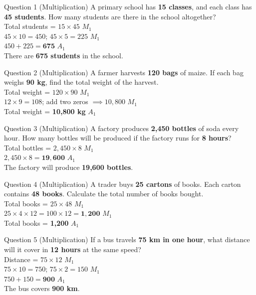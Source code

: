 \documentclass[12pt, a4paper, oneside]{article}
\begin{document}
\begin{solvingbox}{Question 1 (Multiplication)}
A primary school has \textbf{15 classes}, and each class has \textbf{45 students}. How many students are there in the school altogether? \\
Total students = $15 \times 45$ \hfill $M_1$ \\
$45 \times 10 = 450$; $45 \times 5 = 225$ \hfill $M_1$ \\
$450 + 225 = \mathbf{675}$ \hfill $A_1$ \\
There are \textbf{675 students} in the school.
\end{solvingbox}

\begin{solvingbox}{Question 2 (Multiplication)}
A farmer harvests \textbf{120 bags} of maize. If each bag weighs \textbf{90 kg}, find the total weight of the harvest. \\
Total weight = $120 \times 90$ \hfill $M_1$ \\
$12 \times 9 = 108$; add two zeros $\implies 10,800$ \hfill $M_1$ \\
Total weight = \textbf{10,800 kg} \hfill $A_1$
\end{solvingbox}

\begin{solvingbox}{Question 3 (Multiplication)}
A factory produces \textbf{2,450 bottles} of soda every hour. How many bottles will be produced if the factory runs for \textbf{8 hours}? \\
Total bottles = $2,450 \times 8$ \hfill $M_1$ \\
$2,450 \times 8 = \mathbf{19,600}$ \hfill $A_1$ \\
The factory will produce \textbf{19,600 bottles}.
\end{solvingbox}

\begin{solvingbox}{Question 4 (Multiplication)}
A trader buys \textbf{25 cartons} of books. Each carton contains \textbf{48 books}. Calculate the total number of books bought. \\
Total books = $25 \times 48$ \hfill $M_1$ \\
$25 \times 4 \times 12 = 100 \times 12 = \mathbf{1,200}$ \hfill $M_1$ \\
Total books = \textbf{1,200} \hfill $A_1$
\end{solvingbox}

\begin{solvingbox}{Question 5 (Multiplication)}
If a bus travels \textbf{75 km in one hour}, what distance will it cover in \textbf{12 hours} at the same speed? \\
Distance = $75 \times 12$ \hfill $M_1$ \\
$75 \times 10 = 750$; $75 \times 2 = 150$ \hfill $M_1$ \\
$750 + 150 = \mathbf{900}$ \hfill $A_1$ \\
The bus covers \textbf{900 km}.
\end{solvingbox}
\end{document}
